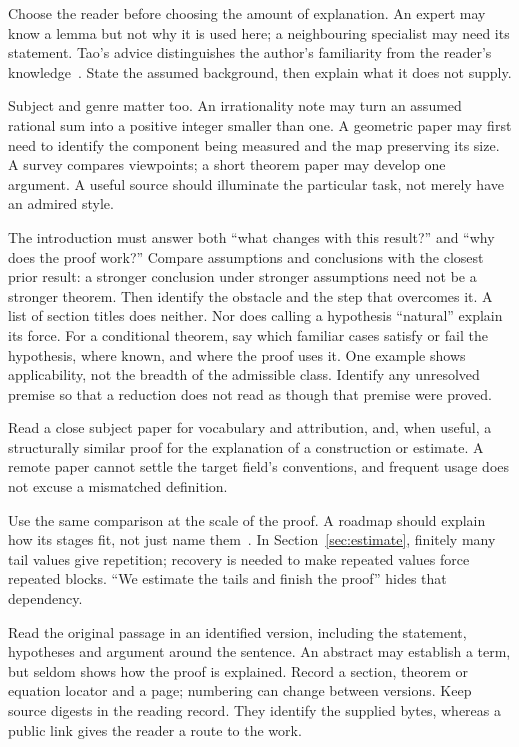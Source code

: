 Choose the reader before choosing the amount of explanation. An expert may
know a lemma but not why it is used here; a neighbouring specialist may need
its statement. Tao's advice distinguishes the author's familiarity from the
reader's knowledge~\cite{tao-detail}. State the assumed background, then explain
what it does not supply.

Subject and genre matter too. An irrationality note may turn an assumed
rational sum into a positive integer smaller than one. A geometric paper
may first need to identify the component being measured and the map preserving
its size. A survey compares viewpoints; a short theorem paper may develop
one argument. A useful source should illuminate the particular task, not
merely have an admired style.

The introduction must answer both ``what changes with this result?'' and
``why does the proof work?'' Compare assumptions and conclusions with the
closest prior result: a stronger conclusion under stronger assumptions need
not be a stronger theorem. Then identify the obstacle and the step that
overcomes it. A list of section titles does neither. Nor does calling a hypothesis ``natural'' explain its
force. For a conditional theorem, say which familiar cases satisfy or fail
the hypothesis, where known, and where the proof uses it. One example shows
applicability, not the breadth of the admissible class. Identify any unresolved
premise so that a reduction does not read as though that premise were proved.

Read a close subject paper for vocabulary and attribution, and, when useful,
a structurally similar proof for the explanation of a construction or estimate.
A remote paper cannot settle the target field's conventions, and frequent usage
does not excuse a mismatched definition.

Use the same comparison at the scale of the proof. A roadmap should explain
how its stages fit, not just name them~\cite[\S4]{halmos}. In
Section~\ref{sec:estimate}, finitely many tail values give repetition; recovery
is needed to make repeated values force repeated blocks. ``We estimate the
tails and finish the proof'' hides that dependency.

Read the original passage in an identified version, including the statement,
hypotheses and argument around the sentence. An abstract may establish a term,
but seldom shows how the proof is explained. Record a section, theorem or
equation locator and a page; numbering can change between versions. Keep
source digests in the reading record. They identify the supplied bytes,
whereas a public link gives the reader a route to the work.

